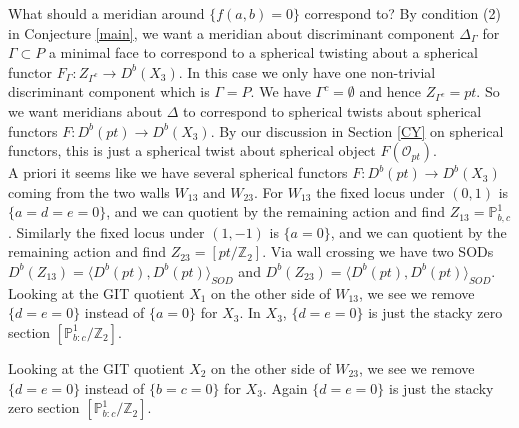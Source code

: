 \documentclass[oneside,reqno]{amsart}
\theoremstyle{definition}
\theoremstyle{definition}
\theoremstyle{definition}
\theoremstyle{definition}
\newcommand{\PP}{\mathbb{P}}
\newcommand{\Z}{\mathbb{Z}}
\newcommand{\Os}{\mathcal{O}}
\begin{document}
\newline
What should a meridian around $\{ f(a,b)=0\}$ correspond to? By condition (2) in Conjecture \ref{main}, we want a meridian about discriminant component $\Delta_{\Gamma}$ for $\Gamma \subset P$ a minimal face to correspond to a spherical twisting about a spherical functor $F_{\Gamma}: Z_{\Gamma^c} \to D^b(X_3)$. In this case we only have one non-trivial discriminant component which is $\Gamma = P$. We have $\Gamma^c = \emptyset$ and hence $Z_{\Gamma^c} = pt$. So we want meridians about $\Delta$ to correspond to spherical twists about spherical functors $F: D^b(pt) \to D^b(X_3)$. By our discussion in Section \ref{CY} on spherical functors, this is just a spherical twist about spherical object $F(\Os_{pt})$.\\
\newline 
A priori it seems like we have several spherical functors $F: D^b(pt) \to D^b(X_3)$ coming from the two walls $W_{13}$ and $W_{23}$. For $W_{13}$ the fixed locus under $(0,1)$ is $\{ a=d=e=0 \}$, and we can quotient by the remaining action and find $Z_{13} = \PP^1_{b,c}$. Similarly the fixed locus under $(1,-1)$ is $\{ a=0\}$, and we can quotient by the remaining action and find $Z_{23} = \left[ pt / \Z_2\right]$. Via wall crossing we have two SODs $D^b(Z_{13}) = \langle D^b(pt), D^b(pt) \rangle_{SOD}$ and $D^b(Z_{23}) = \langle D^b(pt), D^b(pt) \rangle_{SOD}$. Looking at the GIT quotient $X_1$ on the other side of $W_{13}$, we see we  remove $\{ d=e=0\}$ instead of $\{ a=0\}$ for $X_3$. In $X_3$, $\{ d=e=0\}$ is just the stacky zero section $\left[\PP^1_{b:c}/ \Z_2 \right]$.
\begin{center}
\end{center}
Looking at the GIT quotient $X_2$ on the other side of $W_{23}$, we see we  remove $\{ d=e=0\}$ instead of $\{ b=c=0\}$ for $X_3$. Again $\{ d=e=0\}$ is just the stacky zero section $\left[\PP^1_{b:c}/ \Z_2 \right]$.
\begin{center}
\end{center}
\end{document}
